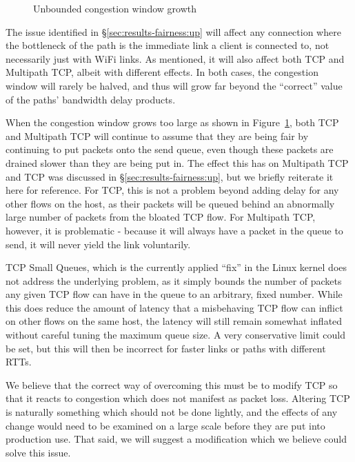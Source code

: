 \begin{figure}[h]
 \centering
 
 \caption{Unbounded congestion window growth}\label{graph:logarithmic}
\end{figure}

The issue identified in \S\ref{sec:results-fairness:up} will affect any
connection where the bottleneck of the path is the immediate link a client is connected
to, not necessarily just with WiFi links. As mentioned, it will also affect both TCP and Multipath TCP, albeit with
different effects. In both cases, the congestion window will rarely be halved,
and thus will grow far beyond the ``correct'' value of the paths'
bandwidth delay products.

When the congestion window grows too large as shown in
Figure~\ref{graph:logarithmic}, both TCP and Multipath TCP will continue to
assume that they are being fair by continuing to put packets onto the send
queue, even though these packets are drained slower than they are being put in.
The effect this has on Multipath TCP and TCP was discussed in
\S\ref{sec:results-fairness:up}, but we briefly reiterate it here for reference.
For TCP, this is
not a problem beyond adding delay for any other flows on the host, as their
packets will be queued behind an abnormally large number of packets from the
bloated TCP flow. For Multipath TCP, however, it is problematic - because it
will always have a packet in the queue to send, it will never yield the link
voluntarily.

TCP Small Queues, which is the currently applied ``fix'' in the Linux kernel
does not address the underlying problem, as it simply bounds the number of
packets any given TCP flow can have in the queue to an
arbitrary, fixed number. While this does reduce the
amount of latency that a misbehaving TCP flow can inflict on other
flows on the same host, the latency will still remain somewhat inflated without
careful tuning the maximum queue size.
A very conservative limit could be
set, but this will then be incorrect for faster links or paths with different RTTs.

We believe that the correct way of overcoming this must be to modify TCP so that
it reacts to congestion which does not manifest as packet loss. Altering TCP is
naturally something which should not be done lightly, and the effects of any
change would need to be examined on a large scale before they are put into
production use. That said, we will suggest a modification which we believe could
solve this issue.


